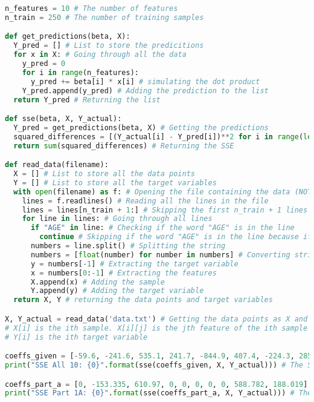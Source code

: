 \documentclass[15pt,a4paper,openright]{article}
\begin{document}
\begin{lstlisting}[language=Python, caption=1e Code]
n_features = 10 # The number of features
n_train = 250 # The number of training samples

def get_predictions(beta, X):
  Y_pred = [] # List to store the predicitions
  for x in X: # Going through all the data
    y_pred = 0
    for i in range(n_features):
      y_pred += beta[i] * x[i] # simulating the dot product
    Y_pred.append(y_pred) # Adding the prediction to the list
  return Y_pred # Returning the list

def sse(beta, X, Y_actual):
  Y_pred = get_predictions(beta, X) # Getting the predictions
  squared_differences = [(Y_actual[i] - Y_pred[i])**2 for i in range(len(Y_pred))] # Calculating the sum of squared errors
  return sum(squared_differences) # Returning the SSE

def read_data(filename):
  X = [] # List to store all the data points
  Y = [] # List to store all the target variables
  with open(filename) as f: # Opening the file containing the data (NOT necessarily .dat)
    lines = f.readlines() # Reading all the lines in the file
    lines = lines[n_train + 1:] # Skipping the first n_train + 1 lines since we need out-of-sample error and the first line is just feature names
    for line in lines: # Going through all lines
      if "AGE" in line: # Checking if the word "AGE" is in the line 
        continue # Skipping if the word "AGE" is in the line because if it is, the line is just feature names, not an actual sample
      numbers = line.split() # Splitting the string
      numbers = [float(number) for number in numbers] # Converting strings to numbers
      y = numbers[-1] # Extracting the target variable
      x = numbers[0:-1] # Extracting the features
      X.append(x) # Adding the sample
      Y.append(y) # Adding the target variable
  return X, Y # returning the data points and target variables

X, Y_actual = read_data('data.txt') # Getting the data points as X and target variables as Y
# X[i] is the ith sample. X[i][j] is the jth feature of the ith sample
# Y[i] is the ith target variable

coeffs_given = [-59.6, -241.6, 535.1, 241.7, -844.9, 407.4, -224.3, 285.2, 762.4, 169.6] # The coefficients given to us
print("SSE All 10: {0}".format(sse(coeffs_given, X, Y_actual))) # The SSE using  the coefficients given

coeffs_part_a = [0, -153.335, 610.97, 0, 0, 0, 0, 0, 588.782, 188.019] # The coefficients from part (a)
print("SSE Part 1A: {0}".format(sse(coeffs_part_a, X, Y_actual))) # The SSE using  the coefficients from part (a)


\end{lstlisting}
\end{document}
